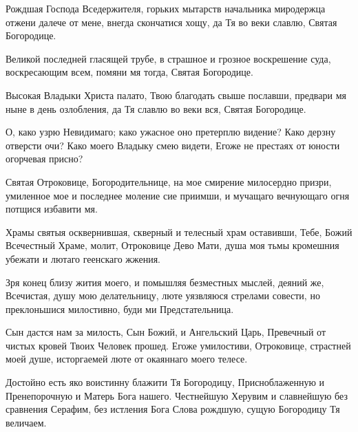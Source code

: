 \begin{mymulticols}

Рождшая Господа Вседержителя, горьких мытарств начальника миродержца отжени далече от мене, внегда скончатися хощу, да Тя во веки славлю, Святая Богородице. 

\slavan

Великой последней гласящей трубе, в страшное и грозное воскрешение суда, воскресающим всем, помяни мя тогда, Святая Богородице. 

\inynen

Высокая Владыки Христа палато, Твою благодать свыше пославши, предвари мя ныне в день озлобления, да Тя славлю во веки вся, Святая Богородице.




О, како узрю Невидимаго; како ужасное оно претерплю видение? Како дерзну отверсти очи? Како моего Владыку смею видети, Егоже не престаях от юности огорчевая присно? 


Святая Отроковице, Богородительнице, на мое смирение милосердно призри, умиленное мое и последнее моление сие приимши, и мучащаго вечнующаго огня потщися избавити мя. 


Храмы святыя осквернившая, скверный и телесный храм оставивши, Тебе, Божий Всечестный Храме, молит, Отроковице Дево Мати, душа моя тьмы кромешния убежати и лютаго геенскаго жжения. 

\slavan

Зря конец близу жития моего, и помышляя безместных мыслей, деяний же, Всечистая, душу мою делательницу, люте уязвляюся стрелами совести, но преклоньшися милостивно, буди ми Предстательница. 

\inynen

Сын дастся нам за милость, Сын Божий, и Ангельский Царь, Превечный от чистых кровей Твоих Человек прошед. Егоже умилостиви, Отроковице, страстней моей душе, исторгаемей люте от окаяннаго моего телесе. 

 Достойно есть яко воистинну блажити Тя Богородицу, Присноблаженную и Пренепорочную и Матерь Бога нашего. Честнейшую Херувим и славнейшую без сравнения Серафим, без истления Бога Слова рождшую, сущую Богородицу Тя величаем.


\end{mymulticols}

